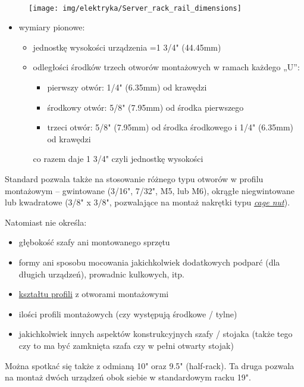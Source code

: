 ~\vspace{-32pt}
\begin{figure}%
\vspace{-0.4cm}\texttt{[image: img/elektryka/Server\_rack\_rail\_dimensions]}\vspace{-2.6cm} %
\end{figure}

\begin{itemize}
	\item wymiary pionowe:
	\begin{itemize}
		\item jednostkę wysokości urządzenia =1 3/4" (44.45mm)
		\item odległości środków trzech otworów montażowych w ramach każdego „U”:
			\begin{itemize}
				\item pierwszy otwór: 1/4" (6.35mm) od krawędzi
				\item środkowy otwór: 5/8" (7.95mm) od środka pierwszego
				\item trzeci otwór: 5/8" (7.95mm) od środka środkowego i 1/4" (6.35mm) od krawędzi
			\end{itemize}
			co razem daje 1 3/4" czyli jednostkę wysokości
	\end{itemize}
\end{itemize}

Standard pozwala także na stosowanie różnego typu otworów w profilu montażowym – gwintowane (3/16", 7/32", M5, lub M6), okrągłe niegwintowane lub kwadratowe (3/8" x 3/8", pozwalające na montaż nakrętki typu \textit{\href{https://www.server-racks.com/what-is-a-cagenut.html}{cage nut}}).

Natomiast nie określa:
\begin{itemize}
	\item głębokość szafy ani montowanego sprzętu
	\item formy ani sposobu mocowania jakichkolwiek dodatkowych podparć (dla długich urządzeń), prowadnic kulkowych, itp.
	\item \href{https://www.server-racks.com/rack-upright-shape.html}{kształtu profili} z otworami montażowymi
	\item ilości profili montażowych (czy występują środkowe / tylne)
	\item jakichkolwiek innych aspektów konstrukcyjnych szafy / stojaka (także tego czy to ma być zamknięta szafa czy w pełni otwarty stojak)
\end{itemize}

Można spotkać się także z odmianą 10" oraz 9.5" (half-rack). Ta druga pozwala na montaż dwóch urządzeń obok siebie w standardowym racku 19".

